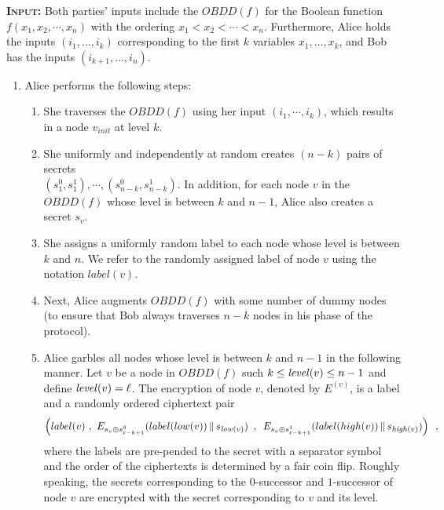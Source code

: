 \textsc{\bf Input:} Both parties' inputs include the $OBDD(f)$ for the Boolean function
$f(x_1,x_2,\cdots,x_n)$ with the ordering $x_1 < x_2 < \cdots < x_n$.
Furthermore, Alice holds the inputs $(i_1,\ldots,i_k)$ corresponding
to the first $k$ variables $x_1,\ldots,x_k$, and Bob has the inputs
$(i_{k+1},\ldots,i_n)$. 
\vspace{1ex}
\begin{enumerate}
\item Alice performs the following steps:
\begin{enumerate}
\item She traverses the $OBDD(f)$ using her
input $(i_1,\cdots,i_k)$, which results in a node $v_{init}$ at level
$k$.

\item She uniformly and independently at random creates $(n-k)$ pairs
of secrets\\$(s_1^0,s_1^1),\cdots,(s_{n-k}^0,s_{n-k}^1)$.  In addition,
for each node $v$ in the $OBDD(f)$ whose level is between $k$ and $n-1$,
Alice also creates a secret $s_v$. 

\item She assigns a uniformly random label to each node whose level is
between $k$ and $n$. We refer to the randomly assigned label of node
$v$ using the notation $label(v)$.

\item Next, Alice augments $OBDD(f)$ with some number of dummy nodes
(to ensure that Bob always traverses $n-k$ nodes in his phase of the protocol). 


\item Alice garbles all nodes whose level is between $k$ and $n-1$
in the following manner. Let $v$ be a node in $OBDD(f)$ such $k \leq
{\it level}(v) \leq n-1$ and define ${\it level}(v)=\ell$. The encryption of node $v$, denoted
by $E^{(v)}$, is a label and a randomly ordered ciphertext pair
\[
\left(label(v)\,\,,\,\,E_{s_v \oplus s_{\ell-k+1}^0} (label(low(v)) \,\|\, s_{{\it low}(v)})\,\,\,,\,\,\,
E_{s_v \oplus s_{\ell-k+1}^1} (label(high(v)) \,\|\, s_{{\it high}(v)})\right)\,\,\,,
\]
where the labels are pre-pended to the secret with a separator symbol
and the order of the ciphertexts is determined by a fair coin
flip. Roughly speaking, the secrets corresponding to the $0$-successor
and $1$-successor of node $v$ are encrypted with the secret
corresponding to $v$ and its level.


\end{enumerate}
\end{enumerate}
